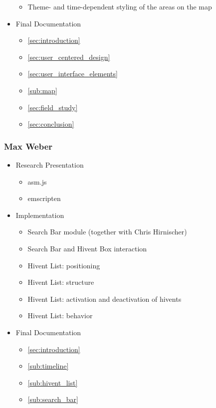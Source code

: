 \begin{itemize}
\begin{itemize}
    \item Theme- and time-dependent styling of the areas on the map
  \end{itemize}
  \item Final Documentation
  \begin{itemize}
    \item \ref{sec:introduction} 
    \item \ref{sec:user_centered_design} 
    \item \ref{sec:user_interface_elements} 
    \item \ref{sub:map} 
    \item \ref{sec:field_study} 
    \item \ref{sec:conclusion} 
  \end{itemize}
\end{itemize}


\subsubsection{Max Weber} %
\label{ssub:max_weber}

\begin{itemize}
  \item Research Presentation
  \begin{itemize}
    \item asm.js
    \item emscripten
  \end{itemize}
  \item Implementation
  \begin{itemize}
    \item Search Bar module (together with Chris Hirnischer)
    \item Search Bar and Hivent Box interaction
    \item Hivent List: positioning
    \item Hivent List: structure
    \item Hivent List: activation and deactivation of hivents
    \item Hivent List: behavior
  \end{itemize}
  \item Final Documentation
  \begin{itemize}
    \item \ref{sec:introduction} 
    \item \ref{sub:timeline} 
    \item \ref{sub:hivent_list} 
    \item \ref{sub:search_bar} 
  \end{itemize}
\end{itemize}

